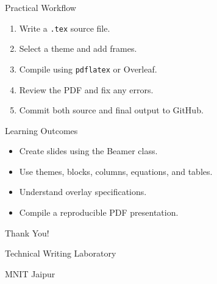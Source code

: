 \documentclass[aspectratio=169,11pt]{beamer}
\begin{document}
\begin{frame}{Practical Workflow}

    \begin{enumerate}

        \item Write a \texttt{.tex} source file.

        \item Select a theme and add frames.

        \item Compile using
              \texttt{pdflatex} or Overleaf.

        \item Review the PDF and fix any errors.

        \item Commit both source and final
              output to GitHub.

    \end{enumerate}

\end{frame}

\begin{frame}{Learning Outcomes}

    \begin{itemize}

        \item Create slides using
              the Beamer class.

        \item Use themes, blocks, columns,
              equations, and tables.

        \item Understand overlay specifications.

        \item Compile a reproducible
              PDF presentation.

    \end{itemize}

\end{frame}

\begin{frame}

    \centering

    \Huge Thank You!

    \vspace{0.6cm}

    \Large Technical Writing Laboratory

    \vspace{0.3cm}

    \large MNIT Jaipur

\end{frame}

\end{document}
